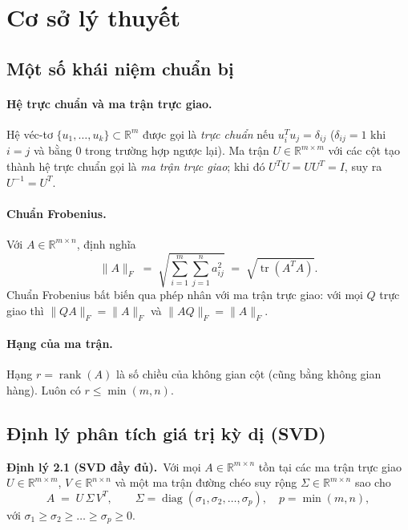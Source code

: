 \section{Cơ sở lý thuyết}

\subsection{Một số khái niệm chuẩn bị}

\paragraph{Hệ trực chuẩn và ma trận trực giao.}
Hệ véc-tơ $\{u_1, \dots, u_k\} \subset \mathbb{R}^m$ được gọi là
\emph{trực chuẩn} nếu $u_i^T u_j = \delta_{ij}$ ($\delta_{ij}=1$ khi $i=j$ và
bằng $0$ trong trường hợp ngược lại). Ma trận $U \in \mathbb{R}^{m\times m}$ với các
cột tạo thành hệ trực chuẩn gọi là \emph{ma trận trực giao}; khi đó
$U^T U = UU^T = I$, suy ra $U^{-1} = U^T$.

\paragraph{Chuẩn Frobenius.}
Với $A \in \mathbb{R}^{m\times n}$, định nghĩa
\[
\|A\|_F \;=\; \sqrt{\sum_{i=1}^m\sum_{j=1}^n a_{ij}^2}
       \;=\; \sqrt{\operatorname{tr}(A^T A)}.
\]
Chuẩn Frobenius bất biến qua phép nhân với ma trận trực giao: với mọi
$Q$ trực giao thì $\|QA\|_F = \|A\|_F$ và $\|AQ\|_F = \|A\|_F$.

\paragraph{Hạng của ma trận.} Hạng $r = \operatorname{rank}(A)$ là số chiều của
không gian cột (cũng bằng không gian hàng). Luôn có $r \le \min(m,n)$.

\subsection{Định lý phân tích giá trị kỳ dị (SVD)}

\begin{mdframed}[backgroundcolor=black!5]
\textbf{Định lý 2.1 (SVD đầy đủ).}\
Với mọi $A \in \mathbb{R}^{m\times n}$ tồn tại các ma trận trực giao
$U \in \mathbb{R}^{m\times m}$, $V \in \mathbb{R}^{n\times n}$ và một ma trận đường chéo
suy rộng $\Sigma \in \mathbb{R}^{m\times n}$ sao cho
\[
A \;=\; U\,\Sigma\,V^T,
\qquad
\Sigma = \operatorname{diag}(\sigma_1, \sigma_2, \dots, \sigma_p),
\quad p = \min(m,n),
\]
với $\sigma_1 \ge \sigma_2 \ge \dots \ge \sigma_p \ge 0$.
\end{mdframed}

